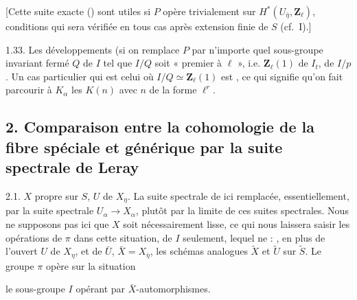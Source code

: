 \documentclass[11pt,a4paper]{article}
\begin{document}
[Cette suite \struck{\ill{}} exacte (\ill{})
sont  utiles si $P$ opère trivialement sur $H^*(U_{\bar\eta}, \mathbf{Z}_\ell)$, \struck{\ill{}} conditions qui sera vérifiée en tous cas après extension finie de $S$ (cf.~I).]

1.33. Les développements    (si on remplace $P$ par n'importe quel sous-groupe invariant fermé $Q$ de $I$  tel que $I/Q$ soit « premier à $\ell$ », i.e. \ill{} \ill{} \ill{} \ill{} \ill{} $\mathbf{Z}_\ell(1)$ de $I_t$, \ill{} de $I/p$. Un cas particulier \ill{} \struck{\ill{}} qui \ill{} \ill{} est celui où $I/Q \simeq \mathbf{Z}_\ell(1)$ est  \ill{} \ill{}, ce qui signifie qu'on fait parcourir à $K_\alpha$ les $K(n)$ avec $n$ de la forme $\ell^r$. \struck{\ill{}}


\subsection*{2. Comparaison entre la cohomologie de la fibre spéciale et générique par la suite spectrale de Leray}

2.1. $X$ propre sur $S$, $U$  de $X_\eta$. La suite spectrale de    ici remplacée, essentiellement, par la suite spectrale   \ill{} \ill{} \ill{} \ill{} \ill{} $U_\alpha \to X_\alpha$, \ill{} plutôt par la limite de ces suites spectrales.  Nous ne supposons pas ici que $X$ soit nécessairement lisse, ce qui nous laissera  \struck{\ill{}} saisir les opérations de $\pi$ dans cette situation, \ill{} de $I$ seulement, lequel ne \ill{} \ill{} : \ill{} \ill{}, en plus de l'ouvert $U$ de $X_\eta$, et de $\bar U$, $\bar X = X_{\bar\eta}$, les schémas analogues $\tilde X$ et $\tilde U$ sur $\tilde S$. \struck{\ill{}}  Le groupe $\pi$ opère sur la situation


le sous-groupe $I$ opérant par $\bar X$-automorphismes.
\end{document}
